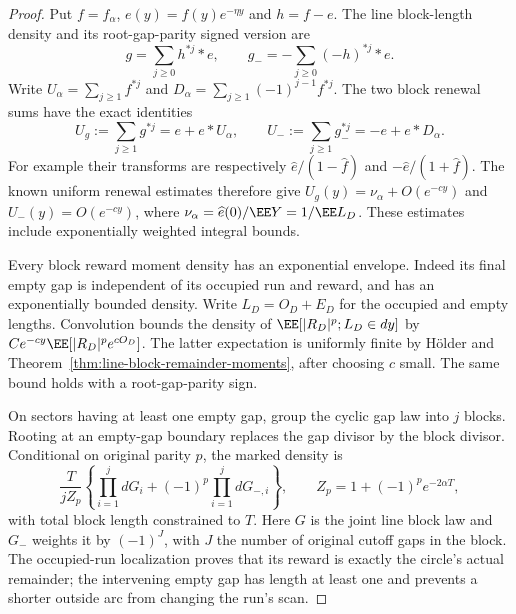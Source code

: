 \documentclass[11pt,letterpaper]{article}
\begin{document}
\begin{proof}
Put $f=f_\alpha$, $e(y)=f(y)e^{-\eta y}$ and $h=f-e$.
The line block-length density and its root-gap-parity signed
version are
\[
 g=\sum_{j\ge0}h^{*j}*e,\qquad
 g_-=-\sum_{j\ge0}(-h)^{*j}*e.
\]
Write $U_\alpha=\sum_{j\ge1}f^{*j}$ and
$D_\alpha=\sum_{j\ge1}(-1)^{j-1}f^{*j}$.
The two block renewal sums have the exact identities
\begin{equation}\label{eq:block-renewal-identities}
 U_g:=\sum_{j\ge1}g^{*j}=e+e*U_\alpha,
 \qquad
 U_-:=\sum_{j\ge1}g_-^{*j}=-e+e*D_\alpha.
\end{equation}
For example their transforms are respectively
$\widehat e/(1-\widehat f)$ and
$-\widehat e/(1+\widehat f)$.
The known uniform renewal estimates therefore give
$U_g(y)=\nu_\alpha+O(e^{-cy})$ and
$U_-(y)=O(e^{-cy})$, where
$\nu_\alpha=\widehat e(0)/\EE Y=1/\EE L_D$.
These estimates include exponentially weighted integral bounds.

Every block reward moment density has an exponential envelope.
Indeed its final empty gap is independent of its occupied run
and reward, and has an exponentially bounded density. Write
$L_D=O_D+E_D$ for the occupied and empty lengths. Convolution
bounds the density of $\EE[|R_D|^p;L_D\in dy]$ by
$Ce^{-cy}\EE[|R_D|^p e^{cO_D}]$. The latter expectation is
uniformly finite by H\"older and
Theorem~\ref{thm:line-block-remainder-moments}, after choosing
$c$ small. The same bound holds with a root-gap-parity sign.

On sectors having at least one empty gap, group the cyclic gap
law into $j$ blocks. Rooting at an empty-gap boundary replaces
the gap divisor by the block divisor. Conditional on original
parity $p$, the marked density is
\[
 \frac{T}{jZ_p}
   \left\{\prod_{i=1}^j dG_i
                 +(-1)^p\prod_{i=1}^j dG_{-,i}\right\},
 \qquad Z_p=1+(-1)^p e^{-2\alpha T},
\]
with total block length constrained to $T$.
Here $G$ is the joint line block law and $G_-$ weights it by
$(-1)^J$, with $J$ the number of original cutoff gaps in the
block. The occupied-run localization proves that its reward
is exactly the circle's actual remainder; the intervening
empty gap has length at least one and prevents a shorter
outside arc from changing the run's scan.


\end{proof}
\end{document}
